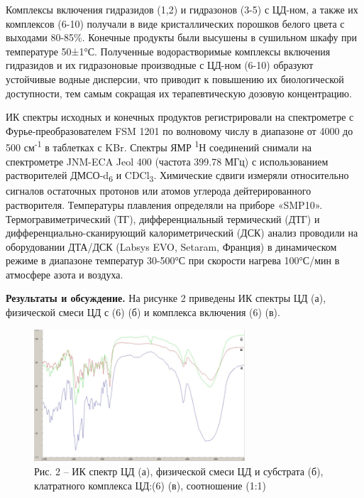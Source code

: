 \begin{multicols}{2}
Комплексы включения гидразидов (1,2) и гидразонов (3-5) с ЦД-ном, а
также их комплексов (6-10) получали в виде кристаллических порошков
белого цвета с выходами 80-85\%. Конечные продукты были высушены в
сушильном шкафу при температуре 50±1°С. Полученные водорастворимые
комплексы включения гидразидов и их гидразоновые производные с ЦД-ном
(6-10) образуют устойчивые водные дисперсии, что приводит к повышению их
биологической доступности, тем самым сокращая их терапевтическую дозовую
концентрацию.

ИК спектры исходных и конечных продуктов регистрировали на спектрометре
с Фурье-преобразователем FSM 1201 по волновому числу в диапазоне от 4000
до 500 см\textsuperscript{-1} в таблетках с KBr. Спектры ЯМР
\textsuperscript{1}Н соединений снимали на спектрометре JNM-ECA Jeol 400
(частота 399.78 МГц) с использованием растворителей
ДМСО-d\textsubscript{6} и CDCl\textsubscript{3}. Химические сдвиги
измеряли относительно сигналов остаточных протонов или атомов углерода
дейтерированного растворителя. Температуры плавления определяли на
приборе «SMP10». Термогравиметрический (ТГ), дифференциальный
термический (ДТГ) и дифференциально-сканирующий калориметрический (ДСК)
анализ проводили на оборудовании ДТА/ДСК (Labsys EVO, Setaram, Франция)
в динамическом режиме в диапазоне температур 30-500°С при скорости
нагрева 100°С/мин в атмосфере азота и воздуха.

{\bfseries Результаты и обсуждение.} На рисунке 2 приведены ИК спектры ЦД
(а), физической смеси ЦД с (6) (б) и комплекса включения (6) (в).
\end{multicols}

\begin{figure}[H]
	\centering
	\includegraphics[width=0.7\textwidth]{assets/44}
	\caption*{Рис. 2 -- ИК спектр ЦД (а), физической смеси ЦД и субстрата (б), клатратного комплекса ЦД:(6) (в), соотношение (1:1)}
\end{figure}

